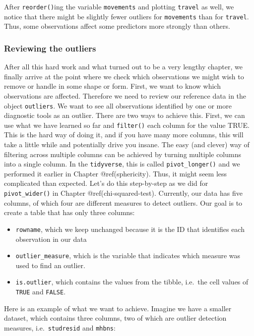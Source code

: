 \documentclass[
  letterpaper,
]{krantz}
\begin{document}
After \texttt{reorder()}ing the variable \texttt{movements} and plotting
\texttt{travel} as well, we notice that there might be slightly fewer
outliers for \texttt{movements} than for \texttt{travel}. Thus, some
observations affect some predictors more strongly than others.

\subsubsection{Reviewing the outliers}\label{sec-reviewing-the-outliers}

After all this hard work and what turned out to be a very lengthy
chapter, we finally arrive at the point where we check which
observations we might wish to remove or handle in some shape or form.
First, we want to know which observations are affected. Therefore we
need to review our reference data in the object \texttt{outliers}. We
want to see all observations identified by one or more diagnostic tools
as an outlier. There are two ways to achieve this. First, we can use
what we have learned so far and \texttt{filter()} each column for the
value TRUE. This is the hard way of doing it, and if you have many more
columns, this will take a little while and potentially drive you insane.
The easy (and clever) way of filtering across multiple columns can be
achieved by turning multiple columns into a single column. In the
\texttt{tidyverse}, this is called \texttt{pivot\_longer()} and we
performed it earlier in Chapter @ref(sphericity). Thus, it might seem
less complicated than expected. Let's do this step-by-step as we did for
\texttt{pivot\_wider()} in Chapter @ref(chi-squared-test). Currently,
our data has five columns, of which four are different measures to
detect outliers. Our goal is to create a table that has only three
columns:

\begin{itemize}
\item
  \texttt{rowname}, which we keep unchanged because it is the ID that
  identifies each observation in our data
\item
  \texttt{outlier\_measure}, which is the variable that indicates which
  measure was used to find an outlier.
\item
  \texttt{is.outlier}, which contains the values from the tibble,
  i.e.~the cell values of \texttt{TRUE} and \texttt{FALSE}.
\end{itemize}

Here is an example of what we want to achieve. Imagine we have a smaller
dataset, which contains three columns, two of which are outlier
detection measures, i.e.~\texttt{studresid} and \texttt{mhbns}:
\end{document}
